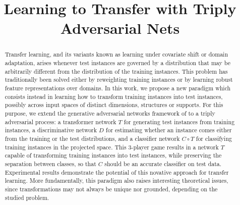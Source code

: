 \documentclass[aoas,preprint,authoryear]{imsart}
\begin{document}
\begin{frontmatter}
\title{Learning to Transfer with Triply Adversarial Nets}


\author{ }

\begin{abstract}

Transfer learning, and its variants known as learning under covariate shift or
domain adaptation, arises whenever test instances are governed by a distribution
that may be arbitrarily different from the distribution of the training
instances. This problem has traditionally been solved either by reweighting
training instances or by learning robust feature representations over domains.
In this work, we propose a new paradigm which consists instead in learning how
to transform training instances into test instances, possibly across input
spaces of distinct dimensions, structures or supports. For this purpose, we
extend the generative adversarial networks framework of
\cite{goodfellow2014generative} to a triply adversarial process: a transformer
network $T$ for generating test instances from training instances, a
discriminative network $D$ for estimating whether an instance comes either from
the training or the test distributions, and a classifier network $C \circ T$ for
classifying training instances in the projected space. This 3-player game
results in a network $T$ capable of transforming training instances into test
instances, while preserving the separation between classes, so that $C$ should
be an accurate classifier on test data. Experimental results demonstrate the
potential of this novative approach for transfer learning. More fundamentally,
this paradigm also raises interesting theoretical issues, since transformations
may not always be unique nor grounded, depending on the studied problem.


\end{abstract}

\end{frontmatter}
\end{document}
